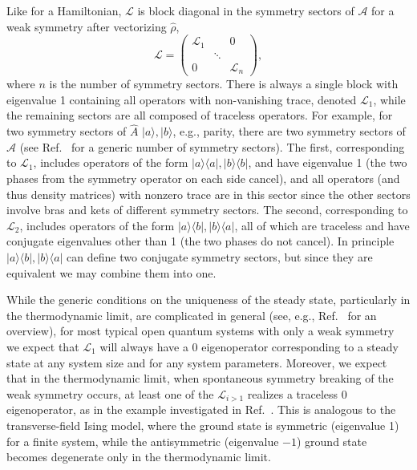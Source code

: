 \documentclass[11pt]{article}
\begin{document}
Like for a Hamiltonian, $\mathcal{L}$ is block diagonal in the symmetry sectors of $\mathcal{A}$ for a weak symmetry after vectorizing $\hat \rho$, 
\begin{equation}
    \mathcal{L} = \left(
    \begin{array}{ccc}
    \mathcal{L}_1 &  & 0 \\
     & \ddots &  \\
    0 &  & \mathcal{L}_{n} 
    \end{array}
    \right),
\end{equation}
where $n$ is the number of symmetry sectors.
There is always a single block with eigenvalue 1 containing all operators with non-vanishing trace, denoted $\mathcal{L}_1$, while the remaining sectors are all composed of traceless operators. For example, for two symmetry sectors of $\hat A$ $|a \rangle, |b \rangle$, e.g., parity, there are two symmetry sectors of $\mathcal{A}$  (see Ref.~\cite{Buca2012} for a generic number of symmetry sectors). The first, corresponding to $\mathcal{L}_1$, includes operators of the form $|a \rangle \langle a|, |b \rangle \langle b|$, and have eigenvalue 1 (the two phases from the symmetry operator on each side cancel), and all operators (and thus density matrices) with nonzero trace are in this sector since the other sectors involve bras and kets of different symmetry sectors. The second, corresponding to $\mathcal{L}_2$, includes operators of the form $|a\rangle \langle b|, |b \rangle \langle a|$, all of which are traceless and have conjugate eigenvalues other than 1 (the two phases do not cancel). In principle $|a\rangle \langle b|, |b \rangle \langle a|$ can define two conjugate symmetry sectors, but since they are equivalent we may combine them into one. 

While the generic conditions on the uniqueness of the steady state, particularly in the thermodynamic limit, are complicated in general (see, e.g., Ref.~\cite{Zhang2024} for an overview), for most typical open quantum systems with only a weak symmetry we expect that $\mathcal{L}_1$ will always have a 0 eigenoperator corresponding to a steady state at any system size and for any system parameters. Moreover, we expect that in the thermodynamic limit, when spontaneous symmetry breaking of the weak symmetry occurs, at least one of the $\mathcal{L}_{i>1}$ realizes a traceless 0 eigenoperator, as in the example investigated in Ref.~\cite{Lieu2020}.
This is analogous to the transverse-field Ising model, where the ground state is symmetric (eigenvalue 1) for a finite system, while the antisymmetric (eigenvalue $-1$) ground state becomes degenerate only in the thermodynamic limit. 
\end{document}
